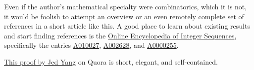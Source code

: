 \documentclass{article}
\begin{document}

\begin{thebibliography}{0}

  Even if the author's mathematical specialty were combinatorics, which it is not,
  it would be foolish to attempt an overview or an even remotely complete set of references
  in a short article like this. A good place to learn about existing results and start finding
  references is the \href{http://oeis.org/}{Online Encyclopedia of Integer Sequences}, specifically
 the entries \href{http://oeis.org/A010027}{A010027}, \href{http://oeis.org/A002628}{A002628}, and
  \href{http://oeis.org/A000255}{A0000255}.

  \href{https://www.quora.com/What-is-the-probability-that-a-shuffled-music-album-will-have-at-least-two-songs-in-their-original-relative-consecutive-order}{This proof by Jed Yang}
  on Quora is short, elegant, and self-contained.

\end{thebibliography}
\end{document}
